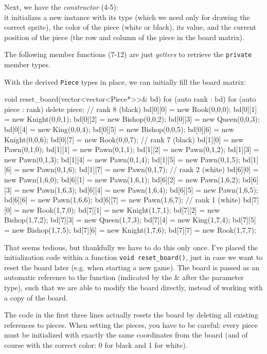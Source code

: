 Next, we have the \emph{constructor} (4-5):\\
it initializes a new instance with its type (which we need only for drawing the correct sprite),
the color of the piece (white or black), its value, and the current position
of the piece (the row and column of the piece in the board matrix).

The following member functions (7-12) are just \emph{getters} to retrieve the
\texttt{private} member types.

With the derived \texttt{Piece} types in place, we can initially fill the board matrix:

\begin{cpp}
void reset_board(vector<vector<Piece*>>& bd) {
  for (auto rank : bd) {
    for (auto piece : rank) {
      delete piece;
    }
  }
  // rank 8 (black)
  bd[0][0] = new Rook(0,0,0);
  bd[0][1] = new Knight(0,0,1);
  bd[0][2] = new Bishop(0,0,2);
  bd[0][3] = new Queen(0,0,3);
  bd[0][4] = new King(0,0,4);
  bd[0][5] = new Bishop(0,0,5);
  bd[0][6] = new Knight(0,0,6);
  bd[0][7] = new Rook(0,0,7);
  // rank 7 (black)
  bd[1][0] = new Pawn(0,1,0);
  bd[1][1] = new Pawn(0,1,1);
  bd[1][2] = new Pawn(0,1,2);
  bd[1][3] = new Pawn(0,1,3);
  bd[1][4] = new Pawn(0,1,4);
  bd[1][5] = new Pawn(0,1,5);
  bd[1][6] = new Pawn(0,1,6);
  bd[1][7] = new Pawn(0,1,7);
  // rank 2 (white)
  bd[6][0] = new Pawn(1,6,0);
  bd[6][1] = new Pawn(1,6,1);
  bd[6][2] = new Pawn(1,6,2);
  bd[6][3] = new Pawn(1,6,3);
  bd[6][4] = new Pawn(1,6,4);
  bd[6][5] = new Pawn(1,6,5);
  bd[6][6] = new Pawn(1,6,6);
  bd[6][7] = new Pawn(1,6,7);
  // rank 1 (white)
  bd[7][0] = new Rook(1,7,0);
  bd[7][1] = new Knight(1,7,1);
  bd[7][2] = new Bishop(1,7,2);
  bd[7][3] = new Queen(1,7,3);
  bd[7][4] = new King(1,7,4);
  bd[7][5] = new Bishop(1,7,5);
  bd[7][6] = new Knight(1,7,6);
  bd[7][7] = new Rook(1,7,7);
}
\end{cpp}

That seems tedious, but thankfully we have to do this only once.
I've placed the initialization code within a function \texttt{void reset_board()},
just in case we want to reset the board later (e.g. when starting a new game).
The board is passed as an automatic reference to the function (indicated by the \& after the
parameter type), such that we are able to modify the board directly,
instead of working with a copy of the board.

The code in the first three lines actually resets the board by deleting all existing
references to pieces.
When setting the pieces, you have to be careful: every piece must be initialized with exactly the
same coordinates from the board (and of course with the correct color: 0 for black and 1 for white).

